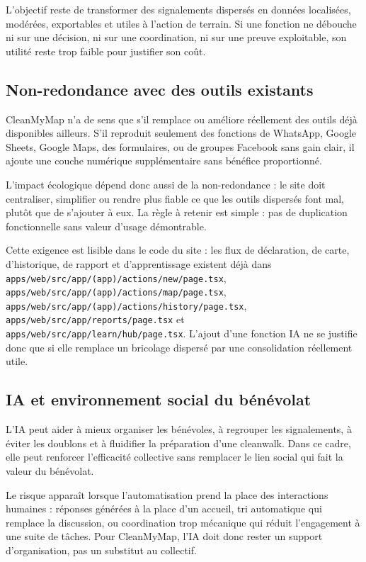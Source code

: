 \documentclass[
  10pt,
  a4paper,
  DIV=11,
  numbers=noendperiod,
  oneside]{scrreprt}
\begin{document}
L'objectif reste de transformer des signalements dispersés en données
localisées, modérées, exportables et utiles à l'action de terrain. Si
une fonction ne débouche ni sur une décision, ni sur une coordination,
ni sur une preuve exploitable, son utilité reste trop faible pour
justifier son coût.

\subsection{Non-redondance avec des outils
existants}\label{non-redondance-avec-des-outils-existants}

CleanMyMap n'a de sens que s'il remplace ou améliore réellement des
outils déjà disponibles ailleurs. S'il reproduit seulement des fonctions
de WhatsApp, Google Sheets, Google Maps, des formulaires, ou de groupes
Facebook sans gain clair, il ajoute une couche numérique supplémentaire
sans bénéfice proportionné.

L'impact écologique dépend donc aussi de la non-redondance : le site
doit centraliser, simplifier ou rendre plus fiable ce que les outils
dispersés font mal, plutôt que de s'ajouter à eux. La règle à retenir
est simple : pas de duplication fonctionnelle sans valeur d'usage
démontrable.

Cette exigence est lisible dans le code du site : les flux de
déclaration, de carte, d'historique, de rapport et d'apprentissage
existent déjà dans \texttt{apps/web/src/app/(app)/actions/new/page.tsx},
\texttt{apps/web/src/app/(app)/actions/map/page.tsx},
\texttt{apps/web/src/app/(app)/actions/history/page.tsx},
\texttt{apps/web/src/app/reports/page.tsx} et
\texttt{apps/web/src/app/learn/hub/page.tsx}. L'ajout d'une fonction IA
ne se justifie donc que si elle remplace un bricolage dispersé par une
consolidation réellement utile.

\subsection{IA et environnement social du
bénévolat}\label{ia-et-environnement-social-du-buxe9nuxe9volat}

L'IA peut aider à mieux organiser les bénévoles, à regrouper les
signalements, à éviter les doublons et à fluidifier la préparation d'une
cleanwalk. Dans ce cadre, elle peut renforcer l'efficacité collective
sans remplacer le lien social qui fait la valeur du bénévolat.

Le risque apparaît lorsque l'automatisation prend la place des
interactions humaines : réponses générées à la place d'un accueil, tri
automatique qui remplace la discussion, ou coordination trop mécanique
qui réduit l'engagement à une suite de tâches. Pour CleanMyMap, l'IA
doit donc rester un support d'organisation, pas un substitut au
collectif.
\end{document}

